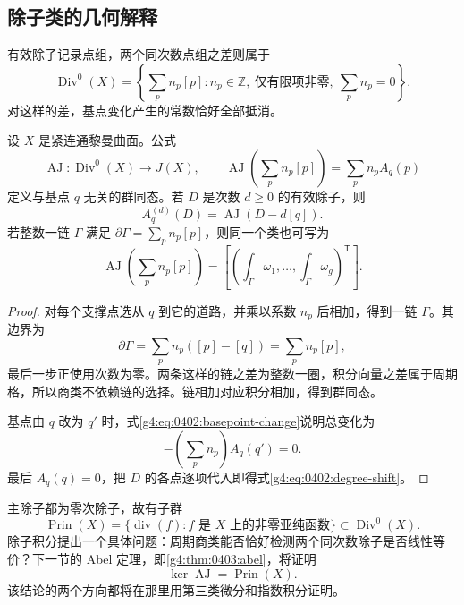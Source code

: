 \subsection{除子类的几何解释}
\label{g4:subsec:0402:04}

有效除子记录点组，两个同次数点组之差则属于
\[
	\operatorname{Div}^0(X)=\left\{\sum_p n_p[p]:
	n_p\in\mathbb Z,\ \text{仅有限项非零},\ \sum_p n_p=0\right\}.
\]
对这样的差，基点变化产生的常数恰好全部抵消。

\begin{proposition}
	\label{g4:prop:0402:divisor-integral}
	设 \(X\) 是紧连通黎曼曲面。公式
	\begin{equation}\label{g4:eq:0402:divisor-integral}
		\operatorname{AJ}:\operatorname{Div}^0(X)\longrightarrow J(X),
		\qquad
		\operatorname{AJ}\left(\sum_p n_p[p]\right)
		=\sum_p n_pA_q(p)
	\end{equation}
	定义与基点 \(q\) 无关的群同态。若 \(D\) 是次数 \(d\ge0\) 的有效除子，则
	\begin{equation}\label{g4:eq:0402:degree-shift}
		A_q^{(d)}(D)=\operatorname{AJ}(D-d[q]).
	\end{equation}
	若整数一链 \(\Gamma\) 满足 \(\partial\Gamma=\sum_p n_p[p]\)，则同一个类也可写为
	\[
		\operatorname{AJ}\left(\sum_p n_p[p]\right)
		=\left[\left(\int_\Gamma\omega_1,\ldots,
		\int_\Gamma\omega_g\right)^{\mathsf T}\right].
	\]
\end{proposition}
\begin{proof}
	对每个支撑点选从 \(q\) 到它的道路，并乘以系数 \(n_p\) 后相加，得到一链 \(\Gamma\)。其边界为
	\[
		\partial\Gamma=\sum_p n_p([p]-[q])
		=\sum_p n_p[p],
	\]
	最后一步正使用次数为零。两条这样的链之差为整数一圈，积分向量之差属于周期格，所以商类不依赖链的选择。链相加对应积分相加，得到群同态。

	基点由 \(q\) 改为 \(q'\) 时，式\eqref{g4:eq:0402:basepoint-change}说明总变化为
	\[
		-\left(\sum_p n_p\right)A_q(q')=0.
	\]
	最后 \(A_q(q)=0\)，把 \(D\) 的各点逐项代入即得式\eqref{g4:eq:0402:degree-shift}。
\end{proof}

主除子都为零次除子，故有子群
\[
	\operatorname{Prin}(X)=
	\{\operatorname{div}(f):f\text{ 是 }X\text{ 上的非零亚纯函数}\}
	\subset\operatorname{Div}^0(X).
\]
除子积分提出一个具体问题：周期商类能否恰好检测两个同次数除子是否线性等价？下一节的 Abel 定理，即\cref{g4:thm:0403:abel}，将证明
\begin{equation}\label{g4:eq:0402:abel-kernel-preview}
	\ker\operatorname{AJ}=\operatorname{Prin}(X).
\end{equation}
该结论的两个方向都将在那里用第三类微分和指数积分证明。

